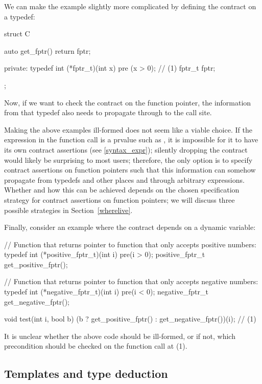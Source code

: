 We can make the example slightly more complicated by defining the contract on a typedef:
\begin{codeblock}
struct C {
  auto get_fptr() { return fptr; }
  
private:
  typedef int (*fptr_t)(int x) pre (x > 0);  // (1)
  fptr_t fptr;
};
\end{codeblock}
Now, if  we want to check the contract on the function pointer, the information from that typedef also needs to propagate through to the call site.

Making the above examples ill-formed does not seem like a viable choice. If the expression in the function call is a prvalue such as , it is impossible for it to have its own contract assertions (see \ref{syntax_expr}); silently dropping the contract would likely be surprising to most users; therefore, the only option is to specify contract assertions on function pointers such that this information can somehow propagate from typedefs and other places and through arbitrary expressions. Whether and how this can be achieved depends on the chosen specification strategy for contract assertions on function pointers; we will discuss three possible strategies in Section~\ref{wherelive}.

Finally, consider an example where the contract depends on a dynamic variable:
\begin{codeblock}
// Function that returns pointer to function that only accepts positive numbers:
typedef int (*positive_fptr_t)(int i) pre(i > 0);
positive_fptr_t get_positive_fptr();

// Function that returns pointer to function that only accepts negative numbers:
typedef int (*negative_fptr_t)(int i) pre(i < 0);
negative_fptr_t get_negative_fptr();

void test(int i, bool b) {
  (b ? get_positive_fptr() : get_negative_fptr())(i);  // (1)
}
\end{codeblock}
It is unclear whether the above code should be ill-formed, or if not, which precondition should be checked on the function call at (1).


\subsection{Templates and type deduction}
\label{semantic_templates}

